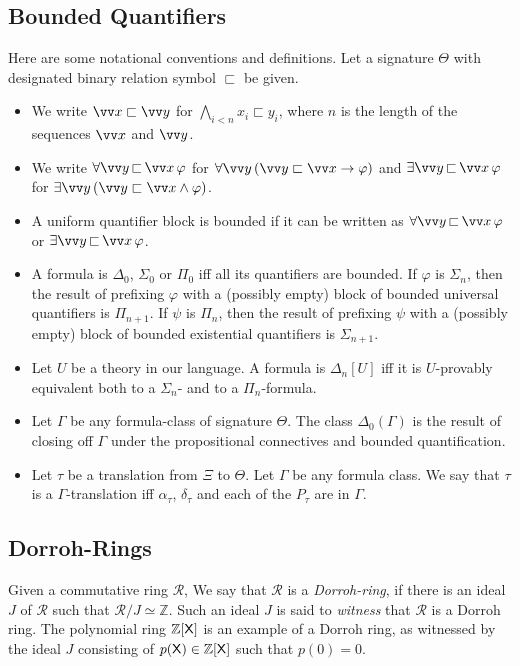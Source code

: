 \documentclass{amsart}
\renewcommand{\phi}{\varphi}
\renewcommand{\Theta}{\varTheta}
\renewcommand{\Xi}{\varXi}
\renewcommand{\Gamma}{\varGamma}
\newcommand{\mc}[1]{\mathcal #1}
\newcommand{\belowz}{\sqsubset}
\newcommand{\below}[2]{#1\sqsubset #2}
\newcommand{\bbelow}[2]{#1\mathop{\sqsubset}#2}
\newcommand{\X}{{\sf X}}
\begin{document}
\subsection{Bounded Quantifiers}
Here are some notational conventions and definitions. Let a signature $\Theta$ with designated binary relation symbol $\belowz$ be given.
\begin{itemize}
\item 
We write $\below{\vv x}{\vv y}$ for $\bigwedge_{i<n} \below{x_i}{y_i}$, where $n$ is the length of the sequences $\vv x$ and $\vv y$.
    \item 
    We  write $\forall \bbelow {\vv y}{\vv x}\, \phi$ for $\forall {\vv y}\, ( \below {\vv y}{\vv x} \to \phi)$ and 
    $\exists \bbelow {\vv y}{\vv x}\, \phi$ for $\exists {\vv y}\, ( \below {\vv y}{\vv x} \wedge \phi)$.
    \item 
    A uniform quantifier block is bounded if it can be written as $\forall \bbelow {\vv y}{\vv x}\, \phi$ or
    $\exists \bbelow {\vv y}{\vv x}\, \phi$.
    \item 
    A formula is $\Delta_0$, $\Sigma_0$ or $\Pi_0$ iff all its quantifiers are bounded.
    If $\phi$ is $\Sigma_n$, then the result of prefixing $\phi$ with a (possibly empty) block of bounded universal quantifiers
    is $\Pi_{n+1}$. If $\psi$ is $\Pi_n$, then the result of prefixing $\psi$ with a (possibly empty) block of bounded existential quantifiers
    is $\Sigma_{n+1}$. 
    \item 
    Let $U$ be a theory in our language. A formula is $\Delta_n[U]$ iff it is $U$-provably equivalent both to a $\Sigma_n$- and to a $\Pi_n$-formula.
    \item 
    Let $\Gamma$ be any formula-class of signature $\Theta$. The class
    $\Delta_0(\Gamma)$ is the result of closing off  $\Gamma$ under the propositional connectives and bounded quantification.
    \item 
    Let $\tau$ be a translation from $\Xi$ to $\Theta$. Let $\Gamma$ be any formula class. We say that $\tau$ is a $\Gamma$-translation iff
    $\alpha_\tau$, $\delta_\tau$ and each of the $P_\tau$ are in $\Gamma$.
\end{itemize}

\subsection{Dorroh-Rings}

Given a commutative ring $\mc R$, We say that $\mc R$ is a \emph{Dorroh-ring}, if there is an ideal $J$ of $\mc R$ such that
$\mc R/J \simeq \mathbb Z$. Such an ideal $J$ is said to \emph{witness} that $\mc R$ is a Dorroh ring. 
The polynomial ring $\mathbb Z [\X]$ is an example of a Dorroh ring, as witnessed by the ideal $J$ consisting of $p(\X)\in \mathbb Z [\X]$ such that $p(0)=0$. 
\end{document}
